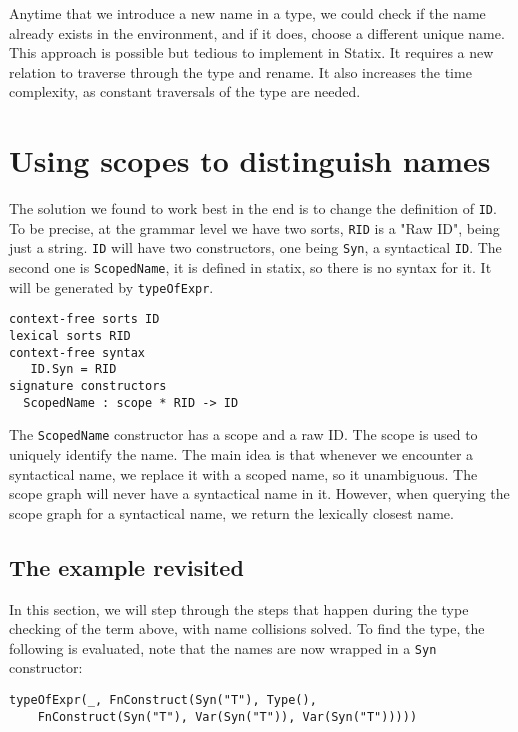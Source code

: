 Anytime that we introduce a new name in a type, we could check if the name already exists in the environment, and if it does, choose a different unique name. This approach is possible but tedious to implement in Statix. It requires a new relation to traverse through the type and rename. It also increases the time complexity, as constant traversals of the type are needed.


\section{Using scopes to distinguish names}

The solution we found to work best in the end is to change the definition of \verb|ID|. To be precise, at the grammar level we have two sorts, \verb|RID| is a "Raw ID", being just a string. \verb|ID| will have two constructors, one being \verb|Syn|, a syntactical \verb|ID|. The second one is \verb|ScopedName|, it is defined in statix, so there is no syntax for it. It will be generated by \verb|typeOfExpr|.

\begin{lstlisting}
context-free sorts ID
lexical sorts RID
context-free syntax
   ID.Syn = RID
signature constructors
  ScopedName : scope * RID -> ID
\end{lstlisting}

The \verb|ScopedName| constructor has a scope and a raw ID. The scope is used to uniquely identify the name. The main idea is that whenever we encounter a syntactical name, we replace it with a scoped name, so it unambiguous. The scope graph will never have a syntactical name in it. However, when querying the scope graph for a syntactical name, we return the lexically closest name.

\subsection{The example revisited}

In this section, we will step through the steps that happen during the type checking of the term above, with name collisions solved. To find the type, the following is evaluated, note that the names are now wrapped in a \verb|Syn| constructor:

\begin{lstlisting}
typeOfExpr(_, FnConstruct(Syn("T"), Type(), 
	FnConstruct(Syn("T"), Var(Syn("T")), Var(Syn("T")))))
\end{lstlisting}

